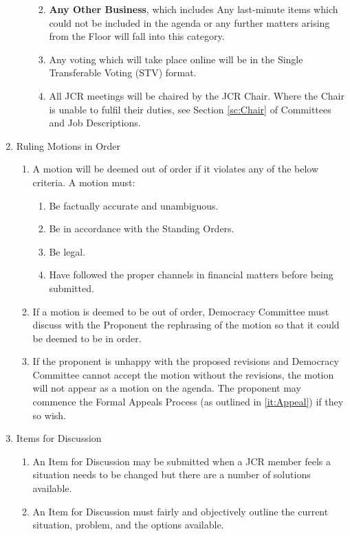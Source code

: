 \begin{enumerate}
\begin{enumerate}
\begin{enumerate}
\begin{enumerate}
            \end{enumerate}
            \item \textbf{Any Other Business}, which includes Any last-minute items which could not be included in the agenda or any further
            matters arising from the Floor will fall into this category.
            \item Any voting which will take place online will be in the Single Transferable Voting (STV) format.
            \item All JCR meetings will be chaired by the JCR Chair. Where the Chair is unable to fulfil their duties, see Section \ref{sc:Chair} of Committees and Job Descriptions.
        \end{enumerate}
    \end{enumerate}
    \item Ruling Motions in Order
    \begin{enumerate}
        \item A motion will be deemed out of order if it violates any of the below criteria. A motion must:
        \begin{enumerate}
            \item Be factually accurate and unambiguous.
            \item Be in accordance with the Standing Orders.
            \item Be legal.
            \item Have followed the proper channels in financial matters before being submitted.
        \end{enumerate}
        \item If a motion is deemed to be out of order, Democracy Committee must discuss with the Proponent
        the rephrasing of the motion so that it could be deemed to be in order.
        \item If the proponent is unhappy with the proposed revisions and Democracy Committee cannot accept the motion without the revisions, the motion will not appear as a motion on the agenda. The proponent may commence the Formal Appeals Process (as outlined in \ref{it:Appeal}) if they so wish.
    \end{enumerate}
    \item Items for Discussion
    \begin{enumerate}
        \item An Item for Discussion may be submitted when a JCR member feels a situation needs to be changed but there are a number of solutions available.
        \item An Item for Discussion must fairly and objectively outline the current situation, problem, and the options available.

\end{enumerate}
\end{enumerate}
